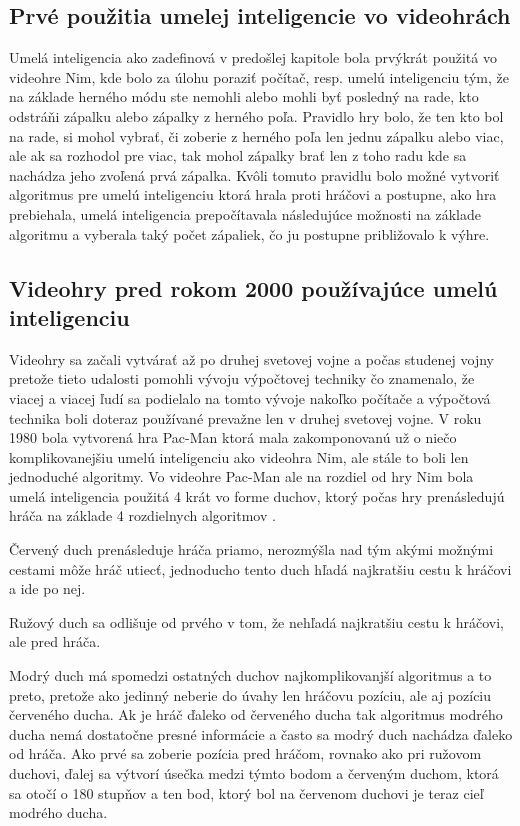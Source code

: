 \documentclass[10pt,oneside,slovak,a4paper]{article}
\begin{document}
\subsection{Prvé použitia umelej inteligencie vo videohrách} \label{kapitola2.1}
Umelá inteligencia ako zadefinová v predošlej kapitole bola prvýkrát použitá vo videohre Nim, kde bolo za úlohu poraziť počítač, resp. umelú inteligenciu tým, že na základe herného módu ste nemohli alebo mohli byť posledný na rade, kto odstráňi zápalku alebo zápalky z herného poľa. Pravidlo hry bolo, že ten kto bol na rade, si mohol vybrať, či zoberie z herného poľa len jednu zápalku alebo viac, ale ak sa rozhodol pre viac, tak mohol zápalky brať len z toho radu kde sa nachádza jeho zvoľená prvá zápalka. Kvôli tomuto pravidlu bolo možné vytvoriť algoritmus pre umelú inteligenciu ktorá hrala proti hráčovi a postupne, ako hra prebiehala, umelá inteligencia prepočítavala následujúce možnosti na základe algoritmu a vyberala taký počet zápaliek, čo ju postupne približovalo k výhre.

\subsection{Videohry pred rokom 2000 používajúce umelú inteligenciu} \label{kapitola2.2}
Videohry sa začali vytvárať až po druhej svetovej vojne a počas studenej vojny pretože tieto udalosti pomohli vývoju výpočtovej techniky čo znamenalo, že viacej a viacej ľudí sa podielalo na tomto vývoje nakoľko počítače a výpočtová technika boli doteraz používané prevažne len v druhej svetovej vojne. V roku 1980 bola vytvorená hra Pac-Man ktorá mala zakomponovanú už o niečo komplikovanejšiu umelú inteligenciu ako videohra Nim, ale stále to boli len jednoduché algoritmy. Vo videohre Pac-Man ale na rozdiel od hry Nim bola umelá inteligencia použitá 4 krát vo forme duchov, ktorý počas hry prenásledujú hráča na základe 4 rozdielnych algoritmov \cite{PacmanAI}.

Červený duch prenásleduje hráča priamo, nerozmýšla nad tým akými možnými cestami môže hráč utiecť, jednoducho tento duch hľadá najkratšiu cestu k hráčovi a ide po nej.

Ružový duch sa odlišuje od prvého v tom, že nehľadá najkratšiu cestu k hráčovi, ale pred hráča.

Modrý duch má spomedzi ostatných duchov najkomplikovanjší algoritmus a to preto, pretože ako jedinný neberie do úvahy len hráčovu pozíciu, ale aj pozíciu červeného ducha. Ak je hráč ďaleko od červeného ducha tak algoritmus modrého ducha nemá dostatočne presné informácie a často sa modrý duch nachádza ďaleko od hráča. Ako prvé sa zoberie pozícia pred hráčom, rovnako ako pri ružovom duchovi, ďalej sa výtvorí úsečka medzi týmto bodom a červeným duchom, ktorá sa otočí o 180 stupňov a ten bod, ktorý bol na červenom duchovi je teraz cieľ modrého ducha.
\end{document}
